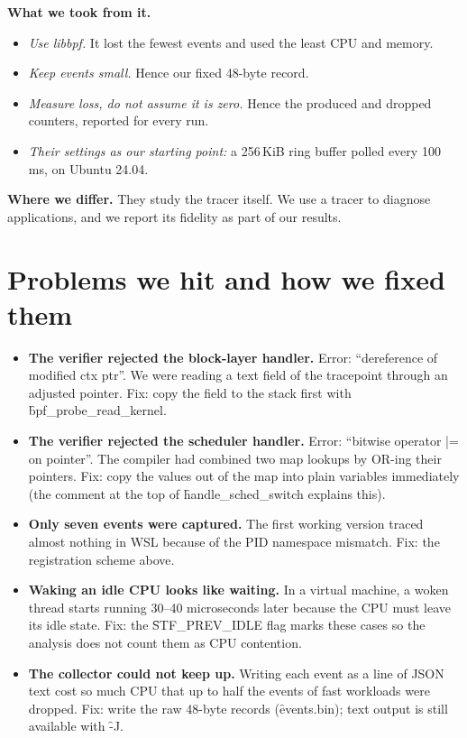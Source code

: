 \documentclass[11pt]{article}
\begin{document}
\textbf{What we took from it.}
\begin{itemize}
\item \emph{Use libbpf.} It lost the fewest events and used the least CPU and memory.
\item \emph{Keep events small.} Hence our fixed 48-byte record.
\item \emph{Measure loss, do not assume it is zero.} Hence the produced and dropped counters, reported for every run.
\item \emph{Their settings as our starting point:} a 256\,KiB ring buffer polled every 100\,ms, on Ubuntu 24.04.
\end{itemize}

\textbf{Where we differ.} They study the tracer itself. We use a tracer to diagnose applications, and we report its fidelity as part of our results.

\section{Problems we hit and how we fixed them}

\begin{itemize}
\item \textbf{The verifier rejected the block-layer handler.} Error: ``dereference of modified ctx ptr''. We were reading a text field of the tracepoint through an adjusted pointer. Fix: copy the field to the stack first with \f{bpf\_probe\_read\_kernel}.
\item \textbf{The verifier rejected the scheduler handler.} Error: ``bitwise operator |= on pointer''. The compiler had combined two map lookups by OR-ing their pointers. Fix: copy the values out of the map into plain variables immediately (the comment at the top of \f{handle\_sched\_switch} explains this).
\item \textbf{Only seven events were captured.} The first working version traced almost nothing in WSL because of the PID namespace mismatch. Fix: the registration scheme above.
\item \textbf{Waking an idle CPU looks like waiting.} In a virtual machine, a woken thread starts running 30--40 microseconds later because the CPU must leave its idle state. Fix: the \f{STF\_PREV\_IDLE} flag marks these cases so the analysis does not count them as CPU contention.
\item \textbf{The collector could not keep up.} Writing each event as a line of JSON text cost so much CPU that up to half the events of fast workloads were dropped. Fix: write the raw 48-byte records (\f{events.bin}); text output is still available with \f{-J}.
\end{itemize}
\end{document}
